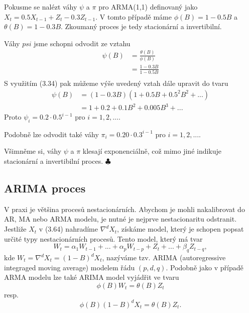 \begin{example}
Pokusme se nalézt váhy $\psi$ a $\pi$ pro ARMA(1,1) definovaný jako $X_t = 0.5 X_{t - 1} + Z_t - 0.3 Z_{t - 1}$. V tomto případě máme $\phi(B) = 1 - 0.5B$ a $\theta(B) = 1 - 0.3B$. Zkoumaný proces je tedy stacionární a invertibilní.

Váhy $psi$ jsme schopni odvodit ze vztahu
\begin{equation}
\begin{split}
\psi(B) & = \frac{\theta(B)}{\phi(B)}\\
\quad & = \frac{1 - 0.3B}{1 - 0.5B}\\
\end{split}
\end{equation}
S využitím (3.34) pak můžeme výše uvedený vztah dále upravit do tvaru
\begin{equation}
\begin{split}
\psi(B) & = (1 - 0.3B)(1 + 0.5B + 0.5^2 B^2 + ...)\\
\quad & = 1 + 0.2 + 0.1 B^2 + 0.005 B^3 + ...
\end{split}
\end{equation}
Proto $\psi_i = 0.2 \cdot 0.5^{i - 1}$ pro $i = 1, 2, ... $.

Podobně lze odvodit také váhy $\pi_i = 0.20 \cdot 0.3^{i - 1}$ pro  $i = 1, 2, ... $.

Všimněme si, váhy $\psi$ a $\pi$ klesají exponenciálně, což mimo jiné indikuje stacionární a invertibilní proces. $\clubsuit$
\end{example}

\subsection{ARIMA proces}

V praxi je většina procesů nestacionárních. Abychom je mohli nakalibrovat do AR, MA nebo ARMA modelu, je nutné je nejprve nestacionaritu odstranit. Jestliže $X_t$ v (3.64) nahradíme $\nabla^d X_t$, získáme model, který je schopen popsat určité typy nestacionárních procesů. Tento model, který má tvar
\begin{equation}
W_t = \alpha_1 W_{t - 1} + ... + \alpha_p W_{t - p} + Z_t + ... + \beta_q Z_{t - q},
\end{equation}
kde $W_t = \nabla^d X_t = (1 - B)^d X_t$, nazýváme tzv. ARIMA (autoregressive integraged moving average) modelem řádu $(p, d, q)$. Podobně jako v případě ARMA modelu lze také ARIMA model vyjádřit ve tvaru
\begin{equation}
\phi(B)W_t = \theta (B) Z_t
\end{equation}
resp.
\begin{equation}
\phi(B)(1 - B)^d X_t = \theta(B) Z_t.
\end{equation}

